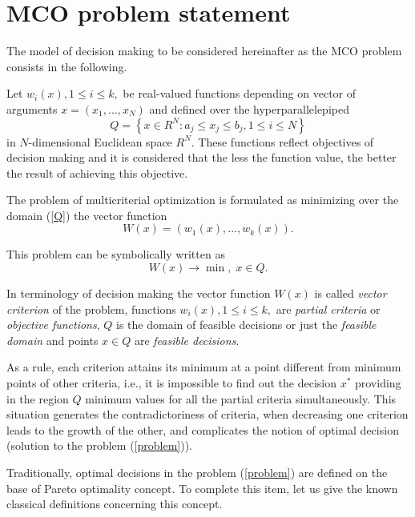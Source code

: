 \documentclass[]{interact}
\theoremstyle{plain}%
\theoremstyle{definition}
\theoremstyle{remark}
\begin{document}
\section{MCO problem statement}

The model of decision making to be considered hereinafter as the MCO problem consists in the following.

Let $w_i(x), 1 \leq i \leq k,$ be real-valued functions depending on vector of arguments $x=(x_1,...,x_N)$  and defined over the hyperparallelepiped 
\begin{equation}\label{Q}
Q = \left\{x \in R^N : a_j \leq x_j \leq b_j, 1 \leq i \leq N \right\}
\end{equation}
in $N$-dimensional Euclidean space $R^N$. These functions reflect objectives of decision making and it is considered that the less the function value, the better the result of achieving this objective.

The problem of multicriterial optimization is formulated as minimizing over the domain (\ref{Q}) the vector function
\begin{equation}\label{W}
W(x) = \left(w_1(x), ..., w_k(x)\right).
\end{equation}

This problem can be symbolically written as
\begin{equation}\label{problem}
W(x) \rightarrow \min , \; x \in Q.
\end{equation}

In terminology of decision making the vector function $W(x)$  is called \textit{vector criterion} of the problem, functions $w_i(x), 1 \leq i \leq k,$ are \textit{partial criteria} or \textit{objective functions}, $Q$ is the domain of feasible decisions or just the \textit{feasible domain} and points $x \in Q$ are \textit{feasible decisions}.

As a rule, each criterion attains its minimum at a point different from minimum points of other criteria, i.e., it is impossible to find out the decision $x^*$   providing in the region $Q$ minimum values for all the partial criteria simultaneously. This situation generates the contradictoriness of criteria, when decreasing one criterion leads to the growth of the other, and complicates the notion of optimal decision (solution to the problem (\ref{problem})).

Traditionally, optimal decisions in the problem (\ref{problem}) are defined on the base of Pareto optimality concept. To complete this item, let us give the known classical definitions concerning this concept.
\end{document}
